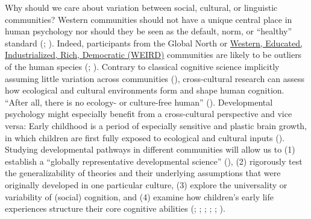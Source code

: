 \documentclass[
]{scrbook}
\begin{document}
Why should we care about variation between social, cultural, or linguistic communities? Western communities should not have a unique central place in human psychology nor should they be seen as the default, norm, or ``healthy'' standard (; ). Indeed, participants from the Global North or \hyperref[acronyms_WEIRD]{Western, Educated, Industrialized, Rich, Democratic (WEIRD)} communities are likely to be outliers of the human species (; ). Contrary to classical cognitive science implicitly assuming little variation across communities (), cross-cultural research can assess how ecological and cultural environments form and shape human cognition. ``After all, there is no ecology- or culture-free human'' (). Developmental psychology might especially benefit from a cross-cultural perspective and vice versa: Early childhood is a period of especially sensitive and plastic brain growth, in which children are first fully exposed to ecological and cultural inputs (). Studying developmental pathways in different communities will allow us to (1) establish a ``globally representative developmental science'' (), (2) rigorously test the generalizability of theories and their underlying assumptions that were originally developed in one particular culture, (3) explore the universality or variability of (social) cognition, and (4) examine how children's early life experiences structure their core cognitive abilities (; ; ; ; ; ).
\end{document}
